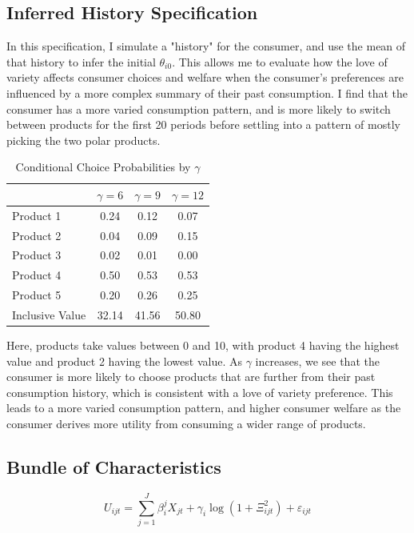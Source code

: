\documentclass[12pt]{article}
\begin{document}
    \subsection{Inferred History Specification}
    In this specification, I simulate a "history" for the consumer, and use the mean of that history to infer the initial $\theta_{i0}$. This allows me to evaluate how the love of variety affects consumer choices and welfare when the consumer's preferences are influenced by a more complex summary of their past consumption. I find that the consumer has a more varied consumption pattern, and is more likely to switch between products for the first 20 periods before settling into a pattern of mostly picking the two polar products.

    \begin{table}[h]
    \centering
    \caption{Conditional Choice Probabilities by $\gamma$}
    \begin{tabular}{lccc}
    \hline\hline
    & $\gamma = 6$ & $\gamma = 9$ & $\gamma = 12$ \\
    \hline
    Product 1       & 0.24  & 0.12  & 0.07  \\
    Product 2       & 0.04  & 0.09  & 0.15  \\
    Product 3       & 0.02  & 0.01  & 0.00  \\
    Product 4       & 0.50  & 0.53  & 0.53  \\
    Product 5       & 0.20  & 0.26  & 0.25  \\
    \hline
    Inclusive Value & 32.14 & 41.56 & 50.80 \\
    \hline\hline
    \end{tabular}
    \end{table}

    Here, products take values between 0 and 10, with product 4 having the highest value and product 2 having the lowest value. As $\gamma$ increases, we see that the consumer is more likely to choose products that are further from their past consumption history, which is consistent with a love of variety preference. This leads to a more varied consumption pattern, and higher consumer welfare as the consumer derives more utility from consuming a wider range of products.

  \subsection{Bundle of Characteristics}

  \begin{equation}
    U_{ijt} = \sum_{j=1}^J\beta_i^j X_{jt} + \gamma_i \log(1 + \Xi_{ijt}^2) + \varepsilon_{ijt}
  \end{equation}
\end{document}
